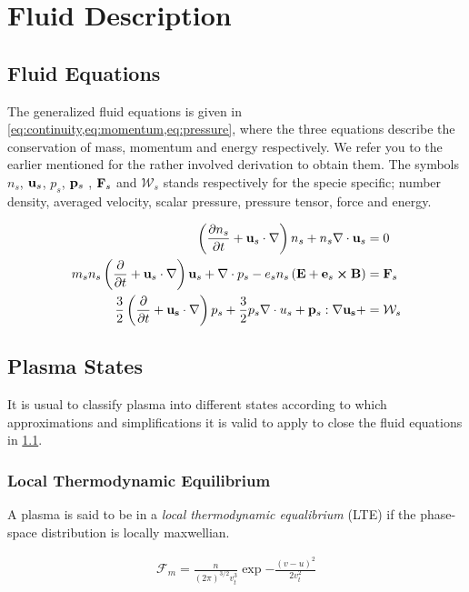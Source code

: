 \section{Fluid Description}
\subsection{Fluid Equations}
	\label{sec:fluid}
	The generalized fluid equations is given in \cref{eq:continuity,eq:momentum,eq:pressure}, where the three equations
	describe the conservation of mass, momentum and energy respectively. We refer you to the earlier mentioned
	\textit{} for the rather involved derivation to obtain them.
	The symbols \(n_s\), \(\vb{u}_s\), \(p_s\), \(\vb{p}_s\) , \(\vb{F}_s\) and \(\mathcal{W}_s\) stands respectively for
	the specie specific; number density, averaged velocity, scalar pressure, pressure tensor, force and energy.

	\begin{align}
		\left( \pdv{n_s}{t} + \vb{u}_s\cdot\nabla \right)n_s + n_s\nabla\cdot \vb{u}_s&=0
		\label{eq:continuity}
		\\
		m_sn_s\left( \pdv{t} + \vb{u}_s \cdot \nabla \right)\vb{u}_s + \nabla\cdot p_s - e_s n_s\left(\vb{E} + \vb{e}_s\cross{\vb{B}}\right) &= \vb{F}_s
		\label{eq:momentum}
		\\
		\frac{3}{2}\left( \pdv{t} + \vb{u_s} \cdot \nabla \right)p_s + \frac{3}{2} p_s\nabla \cdot u_s + \vb{p}_s : \nabla{\vb{u_s}} + &=\mathcal{W}_s
		\label{eq:pressure}
	\end{align}

\subsection{Plasma States}
	It is usual to classify plasma into different states according to which
	approximations and simplifications it is valid to apply to close the fluid equations in \cref{sec:fluid}.

	\subsubsection{Local Thermodynamic Equilibrium}
	A plasma is said to be in a \textit{local thermodynamic equalibrium} (LTE)
	if the phase-space distribution is locally maxwellian.

	\begin{align}
		\mathcal{F}_m = \frac{n}{(2\pi )^{3/2}v_t^3} \exp{-\frac{(v-u)^2}{2v_t^2}}
	\end{align}

